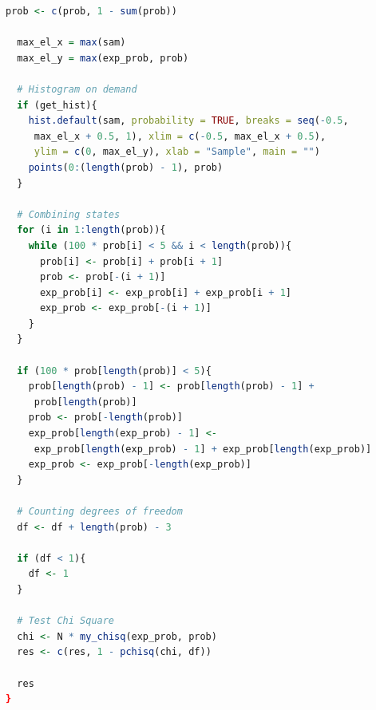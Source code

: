 \documentclass[12pt, specialist, subf, substylefile = spbu_report.rtx]{disser}
\begin{document}
\begin{lstlisting}[language=R]
  prob <- c(prob, 1 - sum(prob))

  max_el_x = max(sam)
  max_el_y = max(exp_prob, prob)

  # Histogram on demand
  if (get_hist){
    hist.default(sam, probability = TRUE, breaks = seq(-0.5,
     max_el_x + 0.5, 1), xlim = c(-0.5, max_el_x + 0.5),
     ylim = c(0, max_el_y), xlab = "Sample", main = "")
    points(0:(length(prob) - 1), prob)
  }

  # Combining states
  for (i in 1:length(prob)){
    while (100 * prob[i] < 5 && i < length(prob)){
      prob[i] <- prob[i] + prob[i + 1]
      prob <- prob[-(i + 1)]
      exp_prob[i] <- exp_prob[i] + exp_prob[i + 1]
      exp_prob <- exp_prob[-(i + 1)]
    }
  }
	
  if (100 * prob[length(prob)] < 5){
    prob[length(prob) - 1] <- prob[length(prob) - 1] +
     prob[length(prob)]
    prob <- prob[-length(prob)]
    exp_prob[length(exp_prob) - 1] <-
     exp_prob[length(exp_prob) - 1] + exp_prob[length(exp_prob)]
    exp_prob <- exp_prob[-length(exp_prob)]
  }
	
  # Counting degrees of freedom
  df <- df + length(prob) - 3
	
  if (df < 1){
    df <- 1
  }
	
  # Test Chi Square
  chi <- N * my_chisq(exp_prob, prob)
  res <- c(res, 1 - pchisq(chi, df))
	
  res
}
	\end{lstlisting}
\end{document}
